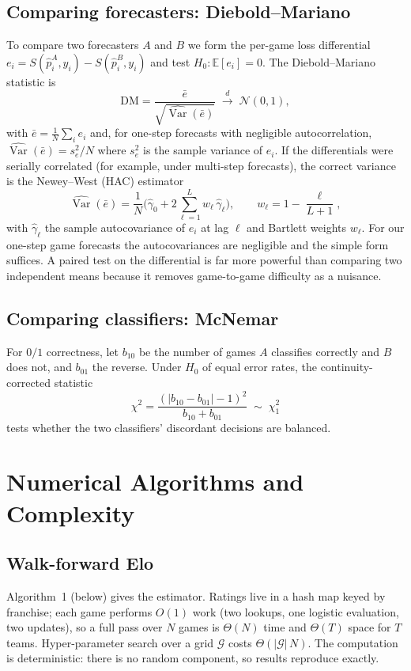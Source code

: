 \documentclass[11pt]{article}
\begin{document}
\subsection{Comparing forecasters: Diebold--Mariano}
To compare two forecasters $A$ and $B$ we form the per-game loss differential
$e_i = S(\hat p^A_i, y_i) - S(\hat p^B_i, y_i)$ and test
$H_0: \mathbb{E}[e_i] = 0$. The Diebold--Mariano statistic is
\begin{equation}
\mathrm{DM} = \frac{\bar e}{\sqrt{\widehat{\operatorname{Var}}(\bar e)}}
\;\xrightarrow{d}\; \mathcal{N}(0,1),
\label{eq:dm}
\end{equation}
with $\bar e = \frac1N\sum_i e_i$ and, for one-step forecasts with negligible
autocorrelation, $\widehat{\operatorname{Var}}(\bar e) = s_e^2/N$ where $s_e^2$ is
the sample variance of $e_i$. If the differentials were serially correlated (for
example, under multi-step forecasts), the correct variance is the Newey--West
(HAC) estimator
\[
\widehat{\operatorname{Var}}(\bar e)
= \frac{1}{N}\Big(\hat\gamma_0 + 2\sum_{\ell=1}^{L}
w_\ell\,\hat\gamma_\ell\Big), \qquad
w_\ell = 1 - \frac{\ell}{L+1},
\]
with $\hat\gamma_\ell$ the sample autocovariance of $e_i$ at lag $\ell$ and
Bartlett weights $w_\ell$. For our one-step game forecasts the autocovariances are
negligible and the simple form suffices. A paired test on the differential is far
more powerful than comparing two independent means because it removes
game-to-game difficulty as a nuisance.

\subsection{Comparing classifiers: McNemar}
For $0/1$ correctness, let $b_{10}$ be the number of games $A$ classifies
correctly and $B$ does not, and $b_{01}$ the reverse. Under $H_0$ of equal error
rates, the continuity-corrected statistic
\begin{equation}
\chi^2 = \frac{(|b_{10} - b_{01}| - 1)^2}{b_{10} + b_{01}} \;\sim\; \chi^2_1
\label{eq:mcnemar}
\end{equation}
tests whether the two classifiers' discordant decisions are balanced.

\section{Numerical Algorithms and Complexity}

\subsection{Walk-forward Elo}
Algorithm~1 (below) gives the estimator. Ratings live in a hash map keyed by
franchise; each game performs $O(1)$ work (two lookups, one logistic evaluation,
two updates), so a full pass over $N$ games is $\Theta(N)$ time and $\Theta(T)$
space for $T$ teams. Hyper-parameter search over a grid $\mathcal G$ costs
$\Theta(|\mathcal G|\,N)$. The computation is deterministic: there is no random
component, so results reproduce exactly.
\end{document}
